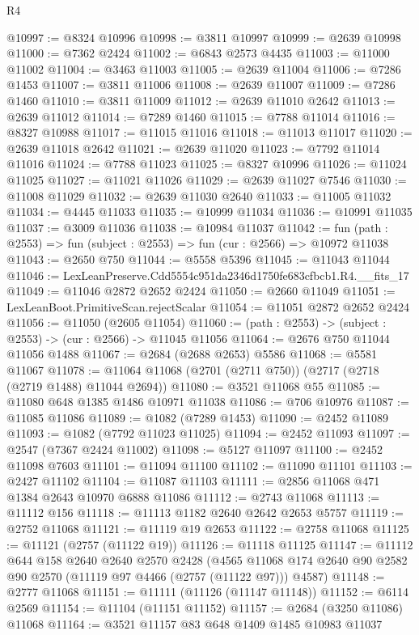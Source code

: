 \begin{lexlean}{R4}
\begin{coremodule}
@10997 := @8324 @10996
@10998 := @3811 @10997
@10999 := @2639 @10998
@11000 := @7362 @2424
@11002 := @6843 @2573 @4435
@11003 := @11000 @11002
@11004 := @3463 @11003
@11005 := @2639 @11004
@11006 := @7286 @1453
@11007 := @3811 @11006
@11008 := @2639 @11007
@11009 := @7286 @1460
@11010 := @3811 @11009
@11012 := @2639 @11010 @2642
@11013 := @2639 @11012
@11014 := @7289 @1460
@11015 := @7788 @11014
@11016 := @8327 @10988
@11017 := @11015 @11016
@11018 := @11013 @11017
@11020 := @2639 @11018 @2642
@11021 := @2639 @11020
@11023 := @7792 @11014 @11016
@11024 := @7788 @11023
@11025 := @8327 @10996
@11026 := @11024 @11025
@11027 := @11021 @11026
@11029 := @2639 @11027 @7546
@11030 := @11008 @11029
@11032 := @2639 @11030 @2640
@11033 := @11005 @11032
@11034 := @4445 @11033
@11035 := @10999 @11034
@11036 := @10991 @11035
@11037 := @3009 @11036
@11038 := @10984 @11037
@11042 := fun (path : @2553) => fun (subject : @2553) => fun (cur : @2566) => @10972 @11038
@11043 := @2650 @750
@11044 := @5558 @5396
@11045 := @11043 @11044
@11046 := LexLeanPreserve.Cdd5554c951da2346d1750fe683cfbcb1.R4.__fits_17
@11049 := @11046 @2872 @2652 @2424
@11050 := @2660 @11049
@11051 := LexLeanBoot.PrimitiveScan.rejectScalar
@11054 := @11051 @2872 @2652 @2424
@11056 := @11050 (@2605 @11054)
@11060 := (path : @2553) -> (subject : @2553) -> (cur : @2566) -> @11045 @11056
@11064 := @2676 @750 @11044 @11056 @1488
@11067 := @2684 (@2688 @2653) @5586
@11068 := @5581 @11067
@11078 := @11064 @11068 (@2701 (@2711 @750)) (@2717 (@2718 (@2719 @1488) @11044 @2694))
@11080 := @3521 @11068 @55
@11085 := @11080 @648 @1385 @1486 @10971 @11038
@11086 := @706 @10976
@11087 := @11085 @11086
@11089 := @1082 (@7289 @1453)
@11090 := @2452 @11089
@11093 := @1082 (@7792 @11023 @11025)
@11094 := @2452 @11093
@11097 := @2547 (@7367 @2424 @11002)
@11098 := @5127 @11097
@11100 := @2452 @11098 @7603
@11101 := @11094 @11100
@11102 := @11090 @11101
@11103 := @2427 @11102
@11104 := @11087 @11103
@11111 := @2856 @11068 @471 @1384 @2643 @10970 @6888 @11086
@11112 := @2743 @11068
@11113 := @11112 @156
@11118 := @11113 @1182 @2640 @2642 @2653 @5757
@11119 := @2752 @11068
@11121 := @11119 @19 @2653
@11122 := @2758 @11068
@11125 := @11121 (@2757 (@11122 @19))
@11126 := @11118 @11125
@11147 := @11112
    @644
    @158
    @2640
    @2640
    @2570
    @2428
    (@4565 @11068 @174 @2640 @90 @2582 @90 @2570 (@11119 @97 @4466 (@2757 (@11122 @97))) @4587)
@11148 := @2777 @11068
@11151 := @11111 (@11126 (@11147 @11148))
@11152 := @6114 @2569
@11154 := @11104 (@11151 @11152)
@11157 := @2684 (@3250 @11086) @11068
@11164 := @3521 @11157 @83 @648 @1409 @1485 @10983 @11037

\end{coremodule}
\end{lexlean}
